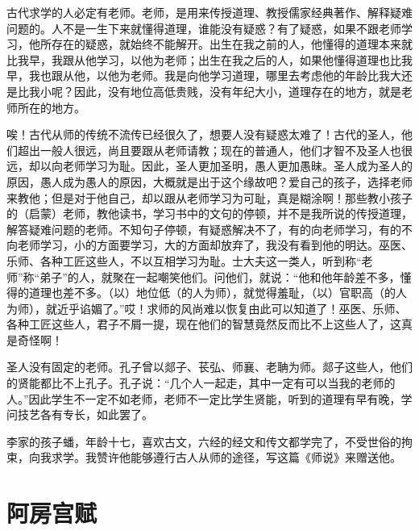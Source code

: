 \documentclass[12pt,UTF-8,openany]{ctexbook}
\begin{document}
\begin{normalsize}
    
    古代求学的人必定有老师。老师，是用来传授道理、教授儒家经典著作、解释疑难问题的。人不是一生下来就懂得道理，谁能没有疑惑？有了疑惑，如果不跟老师学习，他所存在的疑惑，就始终不能解开。出生在我之前的人，他懂得的道理本来就比我早，我跟从他学习，以他为老师；出生在我之后的人，如果他懂得道理也比我早，我也跟从他，以他为老师。我是向他学习道理，哪里去考虑他的年龄比我大还是比我小呢？因此，没有地位高低贵贱，没有年纪大小，道理存在的地方，就是老师所在的地方。
    
    唉！古代从师的传统不流传已经很久了，想要人没有疑惑太难了！古代的圣人，他们超出一般人很远，尚且要跟从老师请教；现在的普通人，他们才智不及圣人也很远，却以向老师学习为耻。因此，圣人更加圣明，愚人更加愚昧。圣人成为圣人的原因，愚人成为愚人的原因，大概就是出于这个缘故吧？爱自己的孩子，选择老师来教他；但是对于他自己，却以跟从老师学习为可耻，真是糊涂啊！那些教小孩子的（启蒙）老师，教他读书，学习书中的文句的停顿，并不是我所说的传授道理，解答疑难问题的老师。不知句子停顿，有疑惑解决不了，有的向老师学习，有的不向老师学习，小的方面要学习，大的方面却放弃了，我没有看到他的明达。巫医、乐师、各种工匠这些人，不以互相学习为耻。士大夫这一类人，听到称“老师”称“弟子”的人，就聚在一起嘲笑他们。问他们，就说：“他和他年龄差不多，懂得的道理也差不多。（以）地位低（的人为师），就觉得羞耻，（以）官职高（的人为师），就近乎谄媚了。”哎！求师的风尚难以恢复由此可以知道了！巫医、乐师、各种工匠这些人，君子不屑一提，现在他们的智慧竟然反而比不上这些人了，这真是奇怪啊！
    
    圣人没有固定的老师。孔子曾以郯子、苌弘、师襄、老聃为师。郯子这些人，他们的贤能都比不上孔子。孔子说：“几个人一起走，其中一定有可以当我的老师的人。”因此学生不一定不如老师，老师不一定比学生贤能，听到的道理有早有晚，学问技艺各有专长，如此罢了。
    
    李家的孩子蟠，年龄十七，喜欢古文，六经的经文和传文都学完了，不受世俗的拘束，向我求学。我赞许他能够遵行古人从师的途径，写这篇《师说》来赠送他。
    
\end{normalsize}



\chapter{阿房宫赋}
\end{document}
